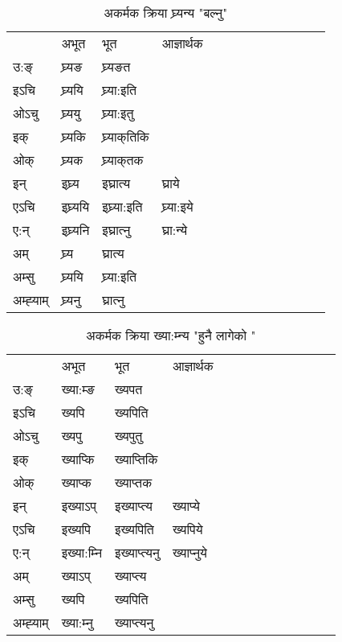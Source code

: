 

\begin{table}[H]
\label{ɛ.vi} \centering
\caption{अकर्मक क्रिया  घ्र्यन्य  "बल्नु"  }
\begin{tabular}{l|l|l|l|l|l|l|l|l|l|l|l|l}  \toprule
&अभूत & भूत & आज्ञार्थक \\ 
उ:ङ्‌ &घ्र्यङ &घ्र्यङत \\ 
इऽचि &घ्र्ययि &घ्र्या:इति   \\ 
ओऽचु &घ्र्ययु &घ्र्या:इतु   \\ 
इक् &घ्र्यकि &घ्र्याक्‌तिकि   \\ 
ओक् &घ्र्यक &घ्र्याक्‌तक   \\ 
इन् & इघ्र्य & इघ्रात्य &घ्राये  \\ 
एऽचि & इघ्र्ययि & इघ्र्या:इति &घ्र्या:इये    \\ 
ए:न् & इघ्र्यनि  & इघ्रात्‍नु &घ्रा:न्ये  \\ 
अम् & घ्र्य & घ्रात्य   \\ 
अम्सु & घ्र्ययि & घ्र्या:इति     \\ 
अम्ह्‍याम् & घ्र्यनु  & घ्रात्‍नु \\ 
\bottomrule
\end{tabular}
\end{table}


\begin{table}[H]
\label{ɛp.vi} \centering
\caption{अकर्मक क्रिया  ख्या:म्‍न्य  "हुनै लागेको "  }
\begin{tabular}{l|l|l|l|l|l|l|l|l|l|l|l|l}  \toprule
&अभूत & भूत & आज्ञार्थक \\ 
उ:ङ्‌ &ख्या:म्ङ &ख्यपत \\ 
इऽचि &ख्यपि &ख्यपिति   \\ 
ओऽचु &ख्यपु &ख्यपुतु   \\ 
इक् &ख्याप्कि &ख्याप्‍तिकि   \\ 
ओक् &ख्याप्क &ख्याप्‍तक   \\ 
इन् & इख्याऽप् & इख्याप्‍त्य &ख्याप्ये  \\ 
एऽचि & इख्यपि & इख्यपिति &ख्यपिये    \\ 
ए:न् & इख्या:म्‍नि  & इख्याप्‍त्यनु &ख्याप्‍नुये  \\ 
अम् & ख्याऽप् & ख्याप्‍त्य   \\ 
अम्सु & ख्यपि & ख्यपिति   \\ 
अम्ह्‍याम् & ख्या:म्‍नु  & ख्याप्‍त्यनु \\ 
\bottomrule
\end{tabular}
\end{table}


